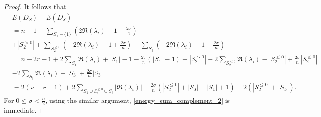 \documentclass[10pt,a4paper]{amsart}
\begin{document}
\begin{proof}
    It follows that 
    \begin{align*}
        &E(D_S)+E(\overline{D_S}) \\
        &= n-1+ \sum_{S_1-\{1\}}  \left( 2\Re(\lambda_i)+1-\frac{2\sigma}{n} \right)\\
        &+|S_2^{>0}|+ \sum_{S_2^{\leq 0}} \left( -2\Re(\lambda_i)-1+\frac{2\sigma}{n} \right) + \sum_{S_3} \left(-2\Re(\lambda_i)-1+\frac{2\sigma}{n} \right)\\
        &= n-2r-1+2\sum_{S_1}\Re(\lambda_i)+|S_1|-1- \frac{2\sigma}{n} \left( |S_1|-1 \right)+|S_2^{>0}| - 2\sum_{S_2^{\leq 0}}\Re(\lambda_i)-|S_2^{\leq 0}|+\frac{2\sigma}{n}|S_2^{\leq 0}| \\
        &-2\sum_{S_3} \Re(\lambda_i)-|S_3|+\frac{2\sigma}{n}|S_3|\\
        &=2(n-r-1)+2\sum_{S_1 \cup S_2^{\leq 0} \cup S_3 }|\Re(\lambda_i)|+\frac{2\sigma}{n}(|S_2^{\leq 0}|+|S_3|-|S_1|+1) -2(|S_2^{\leq 0}|+|S_3|).
    \end{align*}
    For $0\leq \sigma < \frac{n}{2}$, using the similar argument, \eqref{energy_sum_complement_2} is immediate.
    \end{proof}
\end{document}
